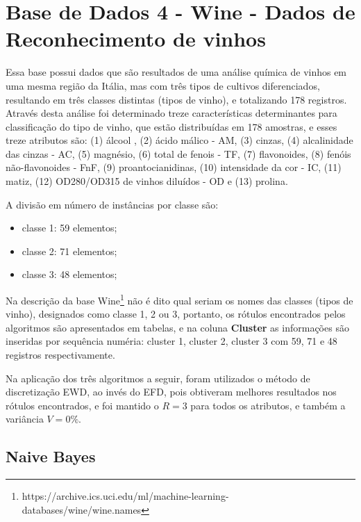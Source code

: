 

\section{Base de Dados 4 - Wine - Dados de Reconhecimento de vinhos}

Essa base \cite{Aeberhard1992} possui dados que são resultados de uma análise química de vinhos em uma mesma região da Itália, mas com três tipos de cultivos diferenciados, resultando em três classes distintas (tipos de vinho), e totalizando 178 registros. Através desta análise foi determinado treze características determinantes para classificação do tipo de vinho, que estão distribuídas em 178 amostras, e  esses treze atributos são: (1) álcool , (2) ácido málico - AM, (3) cinzas, (4) alcalinidade das cinzas - AC, (5) magnésio, (6) total de fenois - TF, (7) flavonoides, (8) fenóis não-flavonoides - FnF, (9) proantocianidinas, (10) intensidade da cor - IC, (11) matiz, (12) OD280/OD315 de vinhos diluídos - OD e (13) prolina.

A divisão em número de instâncias por classe são:

\begin{itemize}[noitemsep]
 \item classe 1: 59 elementos;
 \item classe 2: 71 elementos;
 \item classe 3: 48 elementos;
\end{itemize}

Na descrição da base Wine\footnote{https://archive.ics.uci.edu/ml/machine-learning-databases/wine/wine.names} não é dito qual seriam os nomes das classes (tipos de vinho), designados como classe 1, 2 ou 3, portanto, os rótulos encontrados pelos algoritmos são apresentados em tabelas, e na coluna \textbf{Cluster} as informações são inseridas por sequência numéria: cluster 1, cluster 2, cluster 3 com 59, 71 e 48 registros respectivamente.

Na aplicação dos três algoritmos a seguir, foram  utilizados o método de discretização EWD, ao invés do EFD, pois obtiveram melhores resultados nos rótulos encontrados, e foi mantido o ${R=3}$ para todos os atributos, e também a variância ${V=0\%}$.

\subsection{Naive Bayes} \label{cap:resultados:ssec:wine:bayes}

